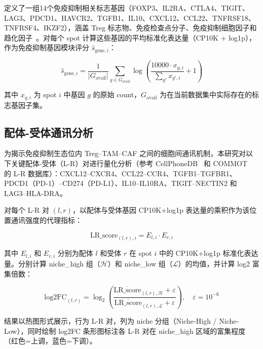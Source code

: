 \documentclass[12pt, a4paper]{ctexart}
\begin{document}
定义了一组14个免疫抑制相关标志基因（FOXP3、IL2RA、CTLA4、TIGIT、LAG3、PDCD1、HAVCR2、TGFB1、IL10、CXCL12、CCL22、TNFRSF18、TNFRSF4、IKZF2），涵盖 Treg 标志物、免疫检查点分子、免疫抑制细胞因子和趋化因子~\cite{sakaguchi2020regulatory, sharma2023immunosuppressive}。对每个 spot 计算这些基因的平均标准化表达量（CP10K + log1p），作为免疫抑制基因模块评分 $\hat{s}_{\text{gene},i}$：

\begin{equation}
\hat{s}_{\text{gene},i} = \frac{1}{|G_{\text{avail}}|} \sum_{g \in G_{\text{avail}}} \log\!\left(\frac{10000 \cdot x_{g,i}}{\displaystyle\sum_{g'} x_{g',i}} + 1\right)
\end{equation}

其中 $x_{g,i}$ 为 spot $i$ 中基因 $g$ 的原始 count，$G_{\text{avail}}$ 为在当前数据集中实际存在的标志基因子集。

\subsection{配体-受体通讯分析}

为揭示免疫抑制生态位内 Treg--TAM--CAF 之间的细胞间通讯机制，本研究对以下关键配体-受体（L-R）对进行量化分析（参考 CellPhoneDB~\cite{efremova2020cellphonedb} 和 COMMOT~\cite{cang2023commot} 的 L-R 数据库）：CXCL12--CXCR4、CCL22--CCR4、TGFB1--TGFBR1、PDCD1（PD-1）--CD274（PD-L1）、IL10--IL10RA、TIGIT--NECTIN2 和 LAG3--HLA-DRA。

对每个 L-R 对 $(l, r)$，以配体与受体基因 CP10K+log1p 表达量的乘积作为该位置通讯强度的代理指标：

\begin{equation}
\text{LR\_score}_{(l,r),i} = E_{l,i} \cdot E_{r,i}
\end{equation}

其中 $E_{l,i}$ 和 $E_{r,i}$ 分别为配体 $l$ 和受体 $r$ 在 spot $i$ 中的 CP10K+log1p 标准化表达量。分别计算 niche\_high 组（$\mathcal{H}$）和 niche\_low 组（$\mathcal{L}$）的均值，并计算 log2 富集倍数：

\begin{equation}
\text{log2FC}_{(l,r)} = \log_2\!\left(\frac{\overline{\text{LR\_score}}_{(l,r),\mathcal{H}} + \varepsilon}{\overline{\text{LR\_score}}_{(l,r),\mathcal{L}} + \varepsilon}\right), \quad \varepsilon = 10^{-6}
\end{equation}

结果以热图形式展示，行为 L-R 对，列为 niche 分组（Niche-High / Niche-Low），同时绘制 log2FC 条形图标注各 L-R 对在 niche\_high 区域的富集程度（红色=上调，蓝色=下调）。
\end{document}
